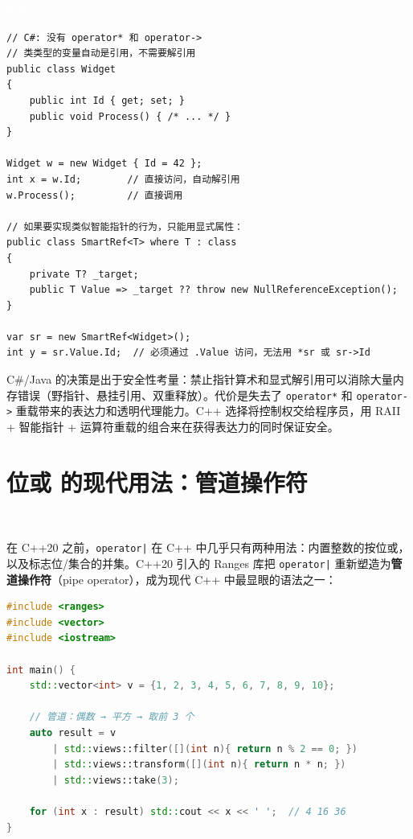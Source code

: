 \documentclass[12pt,a4paper,fontset=fandol]{ctexbook}
\newcommand{\cpp}[1]{C++#1}
\newcommand{\csharp}{C\#}
\newcommand{\Op}[1]{\texttt{operator#1}}
\newcommand{\cpplabel}{%
  \noindent\begin{tcolorbox}[sharp corners,colback=algheadbg,colframe=algheadbg,
    left=6pt,right=6pt,top=2pt,bottom=2pt,boxrule=0pt]
  \textcolor{white}{\small\bfseries\sffamily C++}\end{tcolorbox}%
}
\newcommand{\csharplabel}{%
  \noindent\begin{tcolorbox}[sharp corners,colback=csharpheadbg,colframe=csharpheadbg,
    left=6pt,right=6pt,top=2pt,bottom=2pt,boxrule=0pt]
  \textcolor{white}{\small\bfseries\sffamily C\#}\end{tcolorbox}%
}
\begin{document}
\csharplabel

\begin{lstlisting}[language=CSharp]
// C#: 没有 operator* 和 operator->
// 类类型的变量自动是引用，不需要解引用
public class Widget
{
    public int Id { get; set; }
    public void Process() { /* ... */ }
}

Widget w = new Widget { Id = 42 };
int x = w.Id;        // 直接访问，自动解引用
w.Process();         // 直接调用

// 如果要实现类似智能指针的行为，只能用显式属性：
public class SmartRef<T> where T : class
{
    private T? _target;
    public T Value => _target ?? throw new NullReferenceException();
}

var sr = new SmartRef<Widget>();
int y = sr.Value.Id;  // 必须通过 .Value 访问，无法用 *sr 或 sr->Id
\end{lstlisting}

\begin{note}[title=设计哲学的差异]
\csharp{}/Java 的决策是出于安全性考量：禁止指针算术和显式解引用可以消除大量内存错误（野指针、悬挂引用、双重释放）。代价是失去了 \Op{*} 和 \Op{->} 重载带来的表达力和透明代理能力。\cpp{} 选择将控制权交给程序员，用 RAII + 智能指针 + 运算符重载的组合来在获得表达力的同时保证安全。
\end{note}

\section{位或 \texttt{\textbar} 的现代用法：管道操作符}

\cpplabel

在 \cpp{20} 之前，\Op{|} 在 \cpp{} 中几乎只有两种用法：内置整数的按位或，以及标志位/集合的并集。\cpp{20} 引入的 Ranges 库把 \Op{|} 重新塑造为\textbf{管道操作符}（pipe operator），成为现代 \cpp{} 中最显眼的语法之一：

\begin{lstlisting}[language=C++]
#include <ranges>
#include <vector>
#include <iostream>

int main() {
    std::vector<int> v = {1, 2, 3, 4, 5, 6, 7, 8, 9, 10};

    // 管道：偶数 → 平方 → 取前 3 个
    auto result = v
        | std::views::filter([](int n){ return n % 2 == 0; })
        | std::views::transform([](int n){ return n * n; })
        | std::views::take(3);

    for (int x : result) std::cout << x << ' ';  // 4 16 36
}
\end{lstlisting}
\end{document}
